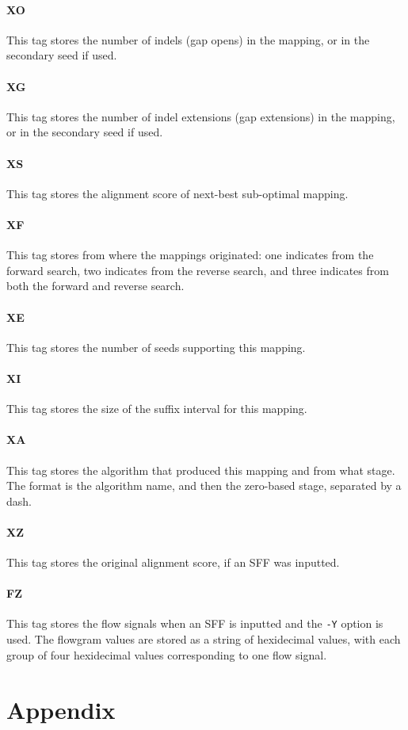 \documentclass[a4paper,12pt]{book}
\newcommand{\TT}[1]{{\tt #1}} %
\begin{document}
\subsubsection{XO}
This tag stores the number of indels (gap opens) in the mapping, or in the secondary seed if used.

\subsubsection{XG}
This tag stores the number of indel extensions (gap extensions) in the mapping, or in the secondary seed if used.

\subsubsection{XS}
This tag stores the alignment score of next-best sub-optimal mapping.

\subsubsection{XF}
This tag stores from where the mappings originated: one indicates from the forward search, two indicates from the reverse search, and three indicates from both the forward and reverse search.

\subsubsection{XE}
This tag stores the number of seeds supporting this mapping.

\subsubsection{XI}
This tag stores the size of the suffix interval for this mapping.

\subsubsection{XA}
This tag stores the algorithm that produced this mapping and from what stage.
The format is the algorithm name, and then the zero-based stage, separated by a dash.

\subsubsection{XZ}
This tag stores the original alignment score, if an SFF was inputted.

\subsubsection{FZ}
This tag stores the flow signals when an SFF is inputted and the \TT{-Y} option is used.
The flowgram values are stored as a string of hexidecimal values, with each group of four hexidecimal values corresponding to one flow signal.

\chapter{Appendix}

{}


\end{document}
